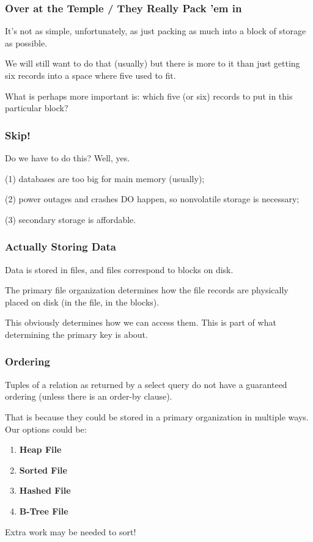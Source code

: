 \begin{frame}
\frametitle{Over at the Temple / They Really Pack 'em in}

It's not as simple, unfortunately, as just packing as much into a block of storage as possible. 

We will still want to do that (usually) but there is more to it than just getting six records into a space where five used to fit. 

What is perhaps more important is: which five (or six) records to put in this particular block?


\end{frame}



\begin{frame}
\frametitle{Skip!}

Do we have to do this? Well, yes. 

(1) databases are too big for main memory (usually); 

(2) power outages and crashes DO happen, so nonvolatile storage is necessary; 

(3) secondary storage is affordable.


\end{frame}


\begin{frame}
\frametitle{Actually Storing Data}

Data is stored in files, and files correspond to blocks on disk. 

The \alert{primary file organization} determines how the file records are physically placed on disk (in the file, in the blocks). 

This obviously determines how we can access them. This is part of what determining the primary key is about. 

\end{frame}


\begin{frame}
\frametitle{Ordering}

Tuples of a relation as returned by a select query do not have a guaranteed ordering (unless there is an order-by clause). 

That is because they could be stored in a primary organization in multiple ways. Our options could be:

\begin{enumerate}
	\item \textbf{Heap File}
	\item \textbf{Sorted File}
	\item \textbf{Hashed File}
	\item \textbf{B-Tree File}
\end{enumerate}

Extra work may be needed to sort!

\end{frame}



